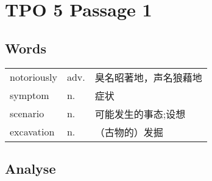 \section{TPO 5 Passage 1}

\subsection{Words}

\begin{tabular}{lll}
    notoriously & adv. & 臭名昭著地，声名狼藉地 \\
    symptom     & n.   & 症状          \\
    scenario    & n.   & 可能发生的事态;设想  \\
    excavation  & n.   & （古物的）发掘     \\
\end{tabular}

\subsection{Analyse}

